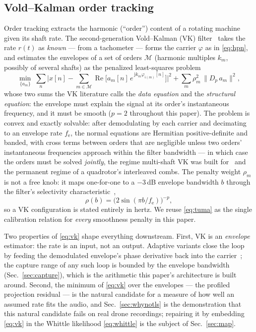 \documentclass[journal]{IEEEtran}
\newcommand{\fsenv}{\ensuremath{f_{\mathrm{e}}}}
\begin{document}
\subsection{Vold--Kalman order tracking}
\label{sec:prelim-vk}

Order tracking extracts the harmonic (``order'') content of a rotating
machine given its shaft rate. The second-generation Vold--Kalman (VK)
filter~\cite{vold1993high,vold1997multi} takes the rate $r(t)$ as
\emph{known} --- from a tachometer --- forms the carrier
$\varphi$ as in \eqref{eq:hpn}, and estimates the envelopes of a set of
orders $\mathcal{M}$ (harmonic multiples $k_m$, possibly of several
shafts) as the penalized least-squares problem
\begin{equation}
  \min_{\{a_m\}} \;
  \sum_n \Big| x[n] - \!\!\sum_{m \in \mathcal{M}}\!\!
  \operatorname{Re}\big[ a_m[n]\, e^{\,\mathrm{j} k_m \varphi_{i(m)}[n]}
    \big] \Big|^2
  + \sum_m \rho_m^2\, \big\| D_p\, a_m \big\|^2 ,
  \label{eq:vk}
\end{equation}
whose two sums the VK literature calls the \emph{data equation} and the
\emph{structural equation}: the envelope must explain the signal at its
order's instantaneous frequency, and it must be smooth ($p = 2$
throughout this paper). The problem is convex and exactly solvable: after
demodulating by each carrier and decimating to an envelope rate
\fsenv{}, the normal equations are Hermitian positive-definite and
banded, with cross terms between orders that are negligible unless two
orders' instantaneous frequencies approach within the filter bandwidth
--- in which case the orders must be solved \emph{jointly}, the regime
multi-shaft VK was built for~\cite{vold1997multi} and the permanent
regime of a quadrotor's interleaved combs. The penalty weight $\rho_m$
is not a free knob: it maps one-for-one to a $-3$\,dB envelope bandwidth
$b$ through the filter's selectivity
characteristic~\cite{herlufsen1999characteristics,tuma2000characteristics},
\begin{equation}
  \rho(b) = \big( 2 \sin ( \pi b / \fsenv ) \big)^{-p},
  \label{eq:tuma}
\end{equation}
so a VK configuration is stated entirely in hertz. We reuse
\eqref{eq:tuma} as the single calibration relation for \emph{every}
smoothness penalty in this paper.

Two properties of \eqref{eq:vk} shape everything downstream. First, VK
is an \emph{envelope} estimator: the rate is an input, not an output.
Adaptive variants close the loop by feeding the demodulated envelope's
phase derivative back into the carrier~\cite{pan2007adaptive,
pan2010extended,jiang2024iavkf}; the capture range of any such loop is
bounded by the envelope bandwidth (Sec.~\ref{sec:capture}), which is
the arithmetic this paper's architecture is built around. Second, the
minimum of \eqref{eq:vk} over the envelopes --- the profiled projection
residual --- is the natural candidate for a measure of how well an
assumed rate fits the audio, and Sec.~\ref{sec:whynotls} is the
demonstration that this natural candidate fails on real drone
recordings; repairing it by embedding \eqref{eq:vk} in the Whittle
likelihood \eqref{eq:whittle} is the subject of
Sec.~\ref{sec:map}.
\end{document}

